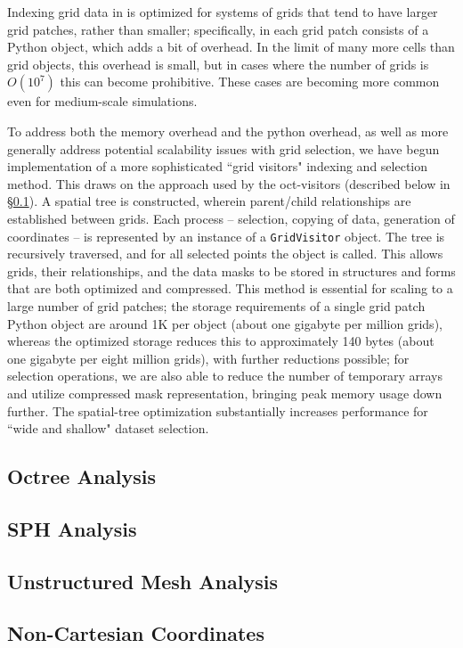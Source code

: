 Indexing grid data in \yt{} is optimized for systems of grids that tend to have
larger grid patches, rather than smaller; specifically, in \yt{} each grid
patch consists of a Python object, which adds a bit of overhead.  In the limit
of many more cells than grid objects, this overhead is small, but in cases
where the number of grids is $O(10^7)$ this can become prohibitive.  These
cases are becoming more common even for medium-scale simulations.

To address both the memory overhead and the python overhead, as well as more
generally address potential scalability issues with grid selection, we have
begun implementation of a more sophisticated ``grid visitors" indexing and
selection method.  This draws on the approach used by the oct-visitors
(described below in \S \ref{sec:octree_analysis}).  A spatial tree is
constructed, wherein parent/child relationships are established between grids.
Each process -- selection, copying of data, generation of coordinates -- is
represented by an instance of a \texttt{GridVisitor} object.  The tree is
recursively traversed, and for all selected points the object is called.  This
allows grids, their relationships, and the data masks to be stored in
structures and forms that are both optimized and compressed.  This method is
essential for scaling to a large number of grid patches; the storage
requirements of a single grid patch Python object are around 1K per object
(about one gigabyte per million grids), whereas the optimized storage reduces
this to approximately 140 bytes (about one gigabyte per eight million grids),
with further reductions possible; for selection operations, we are also able to
reduce the number of temporary arrays and utilize compressed mask
representation, bringing peak memory usage down further.  The spatial-tree
optimization substantially increases performance for ``wide and shallow" dataset
selection.

\subsection{Octree Analysis}
\label{sec:octree_analysis}

\subsection{SPH Analysis}

\subsection{Unstructured Mesh Analysis}

\subsection{Non-Cartesian Coordinates}


